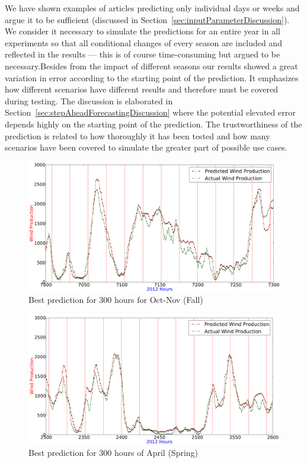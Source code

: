 We have shown examples of articles predicting only individual days or weeks and argue it to be sufficient (discussed in Section~\ref{sec:inputParameterDiscussion}). We consider it necessary to simulate the predictions for an entire year in all experiments so that all conditional changes of every season are included and reflected in the results --- this is of course time-consuming but argued to be necessary.Besides from the impact of different seasons our results showed a great variation in error according to the starting point of the prediction. It emphasizes how different scenarios have different results and therefore must be covered during testing. The discussion is elaborated in Section~\ref{sec:stepAheadForecastingDiscussion} where the potential elevated error depends highly on the starting point of the prediction. The trustworthiness of the prediction is related to how thoroughly it has been tested and how many scenarios have been covered to simulate the greater part of possible use cases. 

\begin{figure}[H]
\centering
\includegraphics[width=0.99\linewidth]{billeder/bestPossiblePredictionWindProduction7000-7300_Fall.png}
\caption{Best prediction for 300 hours for Oct-Nov (Fall)}
\label{fig:bestPredictWPFallForDiscussion}
\end{figure}

\begin{figure}[H]
\centering
\includegraphics[width=0.99\linewidth]{billeder/bestPossiblePredictionWindProduction2300-2600_April_Spring.png}
\caption{Best prediction for 300 hours of April (Spring)}
\label{fig:bestWPPredictSpringForDiscussion}
\end{figure}

